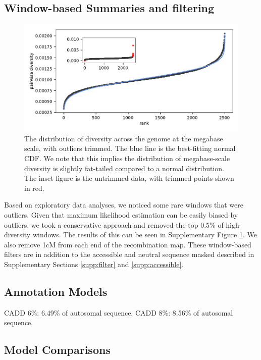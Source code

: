 \documentclass[11pt]{article}
\begin{document}
\subsection{Window-based Summaries and filtering}

\begin{figure}[!htb]
  \centering
  \includegraphics{figures/supplementary/diversity_trimming_dist.pdf}

  \caption{The distribution of diversity across the genome at the megabase
  scale, with outliers trimmed. The blue line is the best-fitting normal CDF.
  We note that this implies the distribution of megabase-scale diversity 
  is slightly fat-tailed compared to a normal distribution.
  The inset figure is the untrimmed data, with trimmed points shown in red. }
  \label{suppfig:trimming}
\end{figure}

Based on exploratory data analyses, we noticed some rare windows that were
outliers. Given that maximum likelihood estimation can be easily biased by
outliers, we took a conservative approach and removed the top 0.5\% of
high-diversity windows. The results of this can be seen in Supplementary
Figure \ref{suppfig:trimming}. We also remove 1cM from each end of the
recombination map. These window-based filters are in addition to the
accessible and neutral sequence masked described in Supplementary Sections
\ref{supp:filter} and \ref{supp:accessible}.

\subsection{Annotation Models}


CADD 6\%: 6.49\% of autosomal sequence.
CADD 8\%: 8.56\% of autosomal sequence.



\subsection{Model Comparisons}
\end{document}
